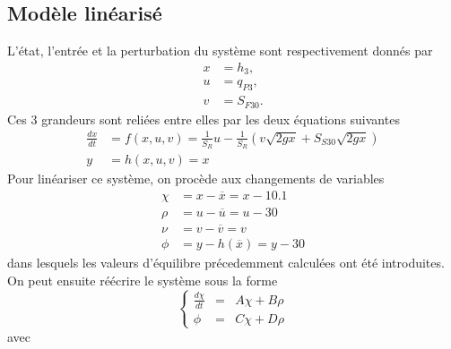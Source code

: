 \documentclass[frenchb, paper=a4, fontsize=11pt]{scrartcl}
\newcommand*\eq[1]{\overline{#1}} 				%
\numberwithin{equation}{section}					%
\numberwithin{figure}{section}					%
\numberwithin{table}{section}						%
\begin{document}
\subsection{Modèle linéarisé}
L'état, l'entrée et la perturbation du système sont respectivement
donnés par
\begin{align}
	x &= h_3, 	\\
	u &= q_{P3},	\\
	v &= S_{F30}.
\end{align}
Ces 3 grandeurs sont reliées entre elles par les deux équations
suivantes
\begin{align}
	\frac{dx}{dt} 	&= f(x,u,v) = \frac{1}{S_R}u - \frac{1}{S_R}(v\sqrt{2gx}
	+ S_{S30}\sqrt{2gx})\\
	y 				&= h(x,u,v) = x
\end{align}
Pour linéariser ce système, on procède aux changements de variables
\begin{align}
	\chi 	&= x - \eq{x} 	= x - 10.1	\\
	\rho 	&= u - \eq{u} 	= u - 30		\\
	\nu		&= v - \eq{v} 	= v			\\
	\phi 	&= y - h(\eq{x})	= y - 30
\end{align}
dans lesquels les valeurs d'équilibre précedemment calculées ont été
introduites.
On peut ensuite réécrire le système sous la forme
\begin{equation}
	\left\{	\begin{array}{ccc}
				\frac{d\chi}{dt} &=& A\chi + B\rho \\
				\phi &=& C\chi + D\rho
			\end{array}
	\right.
\end{equation}
avec 
\end{document}
